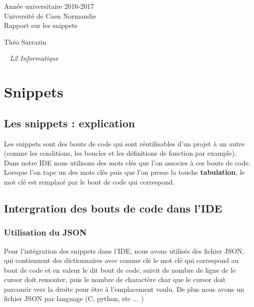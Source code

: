 \documentclass[a4paper,12pt]{article}
\begin{document}
\begin{titlepage}
	\begin{center}
		\Large{Année universitaire 2016-2017}\\
		\Large{Université de Caen Normandie}\\[1cm]
		
		\huge{Rapport sur les snippets}\\
		\vspace{3cm}
		
		Théo Sarrazin
		
	\normalsize{\textit{ ~ L2 Informatique}}\\
		\medskip
		\vspace{2cm}
				
	\end{center}
\end{titlepage}

\tableofcontents
\newpage

\section{Snippets}
	
	\subsection{Les snippets : explication}

		Les snippets sont des bouts de code qui sont réutilisables d'un projet à un autre (comme les conditions, les boucles et les définitions de fonction par example). Dans notre IDE nous utilisons des mots clés que l'on associes à ces bouts de code. Lorsque l'on tape un des mots clés puis que l'on presse la touche \textbf{tabulation}, le mot clé est remplacé par le bout de code qui correspond.

	\subsection{Intergration des bouts de code dans l'IDE}

		\subsubsection{Utilisation du JSON}

			Pour l'intégration des snippets dans l'IDE, nous avons utilisés des fichier JSON, qui contiennent des dictionnaires avec comme clé le mot clé qui correspond au bout de code et en valeur le dit bout de code, suivit de nombre de ligne de le cursor doit remonter, puis le nombre de charactère char que le cursor doit parcourir vers la droite pour être à l'emplacement voulu. De plus nous avons un fichier JSON par language (C, python, etc ... )
\end{document}

